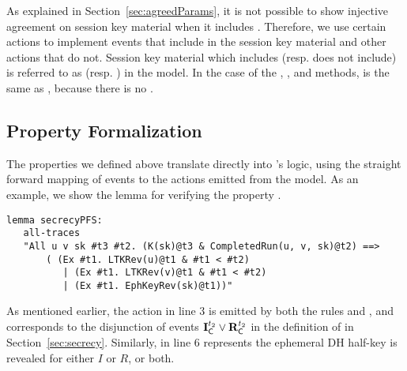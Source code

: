 As explained in Section~\ref{sec:agreedParams}, it is not possible to show
injective agreement on session key material when it includes \mGiy.
%
Therefore, we use certain actions to implement events that include \mGiy{} in the
session key material and other actions that do not.
%
Session key material which includes (resp. does not include) \mGiy{} is referred to as  (resp. ) in the
\mTamarin{} model. %
%
In the case of the \mSigSig, \mSigStat{}, and \mPskPsk{} methods, 
is the same as , because there is no \mGiy.%
%



\subsection{Property Formalization}
\label{sec:propertyFormalization}
The properties we defined above translate directly into \mTamarin's logic,
using the straight forward mapping of events to the actions emitted from the model.
%
As an example, we show the lemma for verifying the property \mPredPfs.
%
\begin{lstlisting}
lemma secrecyPFS:
   all-traces
   "All u v sk #t3 #t2. (K(sk)@t3 & CompletedRun(u, v, sk)@t2) ==>
       ( (Ex #t1. LTKRev(u)@t1 & #t1 < #t2)
          | (Ex #t1. LTKRev(v)@t1 & #t1 < #t2)
          | (Ex #t1. EphKeyRev(sk)@t1))"
\end{lstlisting}
%
As mentioned earlier, the action  in line 3 is
emitted by both the rules  and , and corresponds
to the disjunction of events $\mathbf{I}_{\textsf{C}}^{t_2} \lor \mathbf{R}_{\textsf{C}}^{t_2}$ in the
definition of \mPredPfs{} in Section~\ref{sec:secrecy}.
%
Similarly,  in line 6 represents the ephemeral
DH half-key is revealed for either $I$ or $R$, or both.
%

